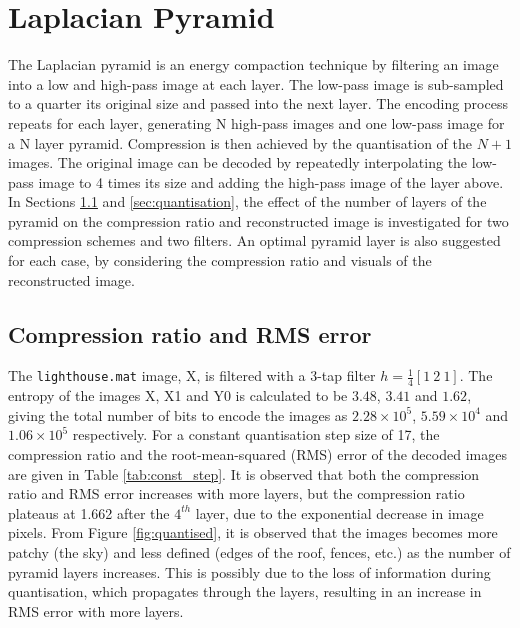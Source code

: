 \section{Laplacian Pyramid} \label{sec:laplacian}
The Laplacian pyramid is an energy compaction technique by filtering an image into a low and high-pass image at each layer. The low-pass image is sub-sampled to a quarter its original size and passed into the next layer. The encoding process repeats for each layer, generating N high-pass images and one low-pass image for a N layer pyramid. Compression is then achieved by the quantisation of the $N+1$ images. The original image can be decoded by repeatedly interpolating the low-pass image to 4 times its size and adding the high-pass image of the layer above.\\

In Sections \ref{sec:compression ratio and rms} and \ref{sec:quantisation}, the effect of the number of layers of the pyramid on the compression ratio and reconstructed image is investigated for two compression schemes and two filters. An optimal pyramid layer is also suggested for each case, by considering the compression ratio and visuals of the reconstructed image.

\subsection{Compression ratio and RMS error} \label{sec:compression ratio and rms}
The \texttt{lighthouse.mat} image, X, is filtered with a 3-tap filter $h = \frac{1}{4}[1{\ }2{\ }1]$. The entropy of the images X, X1 and Y0 is calculated to be $3.48$, $3.41$ and $1.62$, giving the total number of bits to encode the images as $2.28 \times 10^{5}$, $5.59 \times 10^{4}$ and $1.06 \times 10^{5}$ respectively. For a constant quantisation step size of 17, the compression ratio and the root-mean-squared (RMS) error of the decoded images are given in Table \ref{tab:const_step}.  It is observed that both the compression ratio and RMS error increases with more layers, but the compression ratio plateaus at 1.662 after the $4^{th}$ layer, due to the exponential decrease in image pixels. From Figure \ref{fig:quantised}, it is observed that the images becomes more patchy (the sky) and less defined (edges of the roof, fences, etc.) as the number of pyramid layers increases. This is possibly due to the loss of information during quantisation, which propagates through the layers, resulting in an increase in RMS error with more layers.

